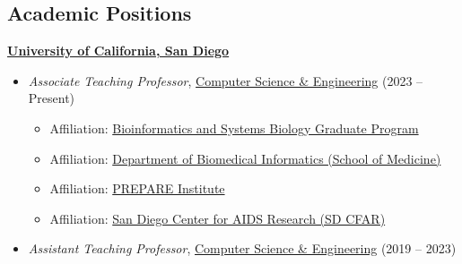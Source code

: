 \documentclass[margin,line]{res}
\begin{document}
\begin{resume}

\section{\sc Academic Positions}
{\bf \href{http://www.ucsd.edu/}{University of California, San Diego}}\\
\vspace*{-.1in}
\begin{itemize}
\item[] \hspace*{-2mm} \textit{Associate Teaching Professor}, \href{http://www.cs.ucsd.edu/}{Computer Science \& Engineering} (2023 -- Present)
\begin{itemize}
\item Affiliation: \href{http://bioinformatics.ucsd.edu/}{Bioinformatics and Systems Biology Graduate Program}
\item Affiliation: \href{http://dbmi.ucsd.edu/}{Department of Biomedical Informatics (School of Medicine)}
\item Affiliation: \href{https://prepare.ucsd.edu/}{PREPARE Institute}
\item Affiliation: \href{https://cfar.ucsd.edu/}{San Diego Center for AIDS Research (SD CFAR)}
\end{itemize}
\item[] \hspace*{-2mm} \textit{Assistant Teaching Professor}, \href{http://www.cs.ucsd.edu/}{Computer Science \& Engineering} (2019 -- 2023)
\end{itemize}


\end{resume}
\end{document}
